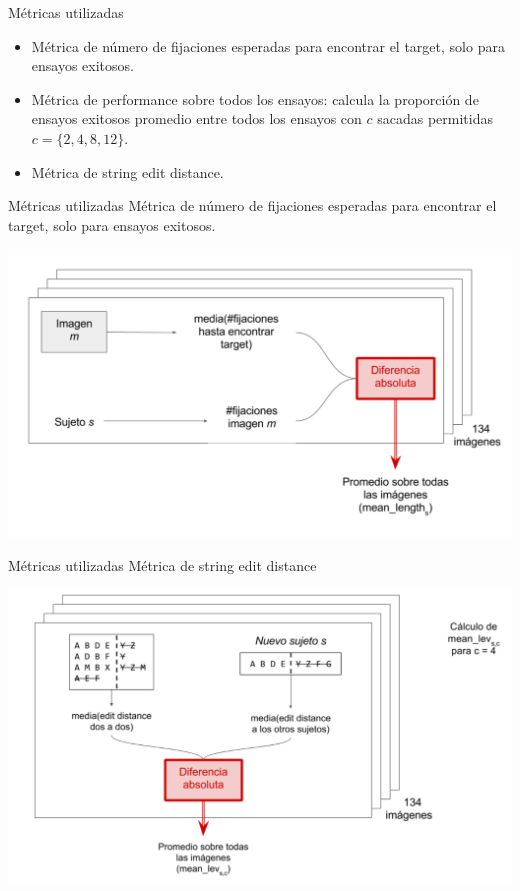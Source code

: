 \documentclass[compress]{beamer}
\begin{document}
\begin{frame}{Métricas utilizadas}
\begin{itemize}
\item Métrica de número de fijaciones esperadas para
encontrar el target, solo para ensayos exitosos.
\item Métrica de performance sobre todos los ensayos: calcula la proporción de ensayos exitosos promedio entre todos los ensayos con $c$ sacadas permitidas $c = \{2,4,8,12\}$.
\item Métrica de string edit distance.
\end{itemize}
\end{frame}

\begin{frame}{Métricas utilizadas}
{Métrica de número de fijaciones esperadas para
encontrar el target, solo para ensayos exitosos.}

\begin{center}
\includegraphics[width=\textwidth]{images/mean_length_explanation.png}
\end{center}
\end{frame}

\begin{frame}{Métricas utilizadas}
{Métrica de string edit distance}

\begin{center}
\includegraphics[width=\textwidth]{images/edit_distance_explanation.png}
\end{center}
\end{frame}
\end{document}
